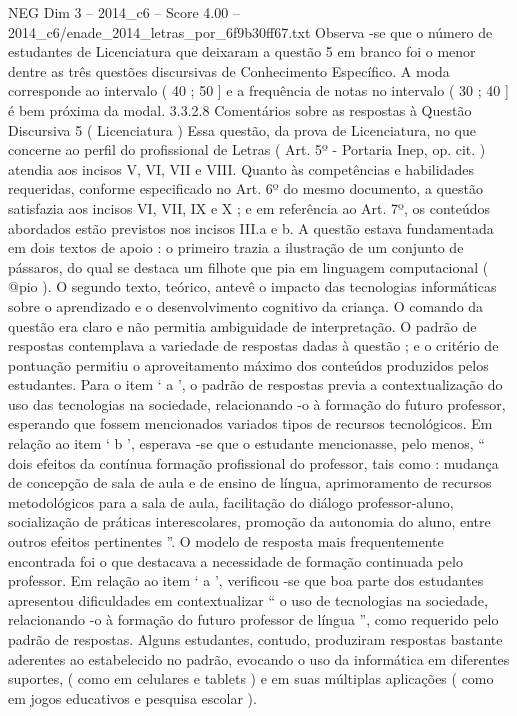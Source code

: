 \begin{textsample}{NEG Dim 3 – 2014\_c6 – Score 4.00 – 2014\_c6/enade\_2014\_letras\_por\_6f9b30ff67.txt}
Observa -se que o número de estudantes de Licenciatura que deixaram a questão 5 em branco foi o menor dentre as três questões discursivas de Conhecimento Específico.
A moda corresponde ao intervalo ( 40 ; 50 ] e a frequência de notas no intervalo ( 30 ; 40 ] é bem próxima da modal. 3.3.2.8 Comentários sobre as respostas à Questão Discursiva 5 ( Licenciatura ) Essa questão, da prova de Licenciatura, no que concerne ao perfil do profissional de Letras ( Art. 5º - Portaria Inep, op. cit. ) atendia aos incisos V, VI, VII e VIII.
Quanto às competências e habilidades requeridas, conforme especificado no Art. 6º do mesmo documento, a questão satisfazia aos incisos VI, VII, IX e X ; e em referência ao Art. 7º, os conteúdos abordados estão previstos nos incisos III.a e b.
A questão estava fundamentada em dois textos de apoio : o primeiro trazia a ilustração de um conjunto de pássaros, do qual se destaca um filhote que pia em linguagem computacional ( @pio ).
O segundo texto, teórico, antevê o impacto das tecnologias informáticas sobre o aprendizado e o desenvolvimento cognitivo da criança.
O comando da questão era claro e não permitia ambiguidade de interpretação.
O padrão de respostas contemplava a variedade de respostas dadas à questão ; e o critério de pontuação permitiu o aproveitamento máximo dos conteúdos produzidos pelos estudantes.
Para o item ‘ a ’, o padrão de respostas previa a contextualização do uso das tecnologias na sociedade, relacionando -o à formação do futuro professor, esperando que fossem mencionados variados tipos de recursos tecnológicos.
Em relação ao item ‘ b ’, esperava -se que o estudante mencionasse, pelo menos, “ dois efeitos da contínua formação profissional do professor, tais como : mudança de concepção de sala de aula e de ensino de língua, aprimoramento de recursos metodológicos para a sala de aula, facilitação do diálogo professor-aluno, socialização de práticas interescolares, promoção da autonomia do aluno, entre outros efeitos pertinentes ”.
O modelo de resposta mais frequentemente encontrada foi o que destacava a necessidade de formação continuada pelo professor.
Em relação ao item ‘ a ’, verificou -se que boa parte dos estudantes apresentou dificuldades em contextualizar “ o uso de tecnologias na sociedade, relacionando -o à formação do futuro professor de língua ”, como requerido pelo padrão de respostas.
Alguns estudantes, contudo, produziram respostas bastante aderentes ao estabelecido no padrão, evocando o uso da informática em diferentes suportes, ( como em celulares e tablets ) e em suas múltiplas aplicações ( como em jogos educativos e pesquisa escolar ).

\end{textsample}

